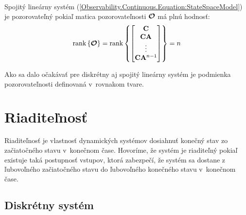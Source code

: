 \documentclass[a4paper, 10pt, ]{article}
\begin{document}
\begin{theorem}
    Spojitý lineárny systém (\ref{Observability.Continuous.Equation:StateSpaceModel}) je pozorovateľný pokiaľ matica pozorovateľnosti $\boldsymbol{\mathcal{O}}$ má plnú hodnosť:
    \begin{equation}
        \label{Observability.Continuous.Equation:ObservabilityTheorem}
        \mathrm{rank} \left\{ \boldsymbol{\mathcal{O}} \right\} = 
        \mathrm{rank} \left\{
            \begin{bmatrix}
                \mathbf{C}                \\
                \mathbf{C} \mathbf{A}         \\
                \vdots                \\
                \mathbf{C} \mathbf{A}^{n - 1} \\
            \end{bmatrix}
        \right\} = 
        n
    \end{equation}
\end{theorem}

Ako sa dalo očakávať pre diskrétny aj spojitý lineárny systém je podmienka pozorovateľnosti definovaná v~rovnakom tvare.









\section{Riaditeľnosť}

Riaditeľnosť je vlastnosť dynamických systémov dosiahnuť konečný stav zo začiatočného stavu v~konečnom čase. Hovoríme, že systém je riaditeľný pokiaľ existuje taká postupnosť vstupov, ktorá zabezpečí, že systém sa dostane z ľubovoľného začiatočného stavu do ľubovoľného konečného stavu v~konečnom čase.

\subsection{Diskrétny systém}
\end{document}
